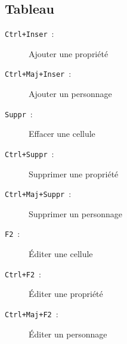 \documentclass[a4paper,12pt]{article}
\newcommand*{\interfaceitem}[1]{\texttt{#1}}
\begin{document}
\subsection{Tableau}

\begin{description}
    \item[\interfaceitem{Ctrl+Inser}~:]{Ajouter une propriété}
    \item[\interfaceitem{Ctrl+Maj+Inser}~:]{Ajouter un personnage}
    \item[\interfaceitem{Suppr}~:]{Effacer une cellule}
    \item[\interfaceitem{Ctrl+Suppr}~:]{Supprimer une propriété}
    \item[\interfaceitem{Ctrl+Maj+Suppr}~:]{Supprimer un personnage}
    \item[\interfaceitem{F2}~:]{Éditer une cellule}
    \item[\interfaceitem{Ctrl+F2}~:]{Éditer une propriété}
    \item[\interfaceitem{Ctrl+Maj+F2}~:]{Éditer un personnage}
\end{description}
\end{document}
